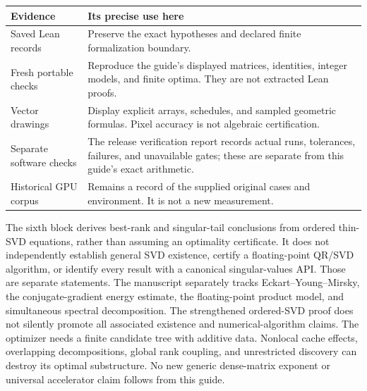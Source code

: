 \begin{tabularx}{\linewidth}{@{}p{.25\linewidth}Y@{}}\toprule
Evidence & Its precise use here \\\midrule
Saved Lean records & Preserve the exact hypotheses and declared finite formalization boundary.\\
Fresh portable checks & Reproduce the guide's displayed matrices, identities, integer models, and finite optima. They are not extracted Lean proofs.\\
Vector drawings & Display explicit arrays, schedules, and sampled geometric formulas. Pixel accuracy is not algebraic certification.\\
Separate software checks & The release verification report records actual runs, tolerances, failures, and unavailable gates; these are separate from this guide's exact arithmetic.\\
Historical GPU corpus & Remains a record of the supplied original cases and environment. It is not a new measurement.\\\bottomrule
\end{tabularx}
The sixth block derives best-rank and singular-tail conclusions from ordered thin-SVD equations, rather than assuming an optimality certificate. It does not independently establish general SVD existence, certify a floating-point QR/SVD algorithm, or identify every result with a canonical singular-values API. Those are separate statements.
The manuscript separately tracks Eckart--Young--Mirsky, the conjugate-gradient energy estimate, the floating-point product model, and simultaneous spectral decomposition. The strengthened ordered-SVD proof does not silently promote all associated existence and numerical-algorithm claims.
The optimizer needs a finite candidate tree with additive data. Nonlocal cache effects, overlapping decompositions, global rank coupling, and unrestricted discovery can destroy its optimal substructure. No new generic dense-matrix exponent or universal accelerator claim follows from this guide.
